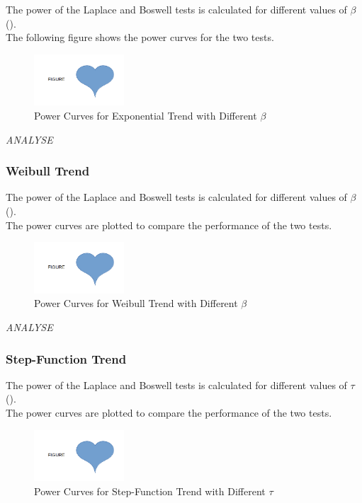 \documentclass{journalstyle}
\begin{document}
The power of the Laplace and Boswell tests is calculated for different values of $\beta$ (). \\
The following figure shows the power curves for the two tests. \\
\begin{figure}[H]
    \centering
    \includegraphics[width=0.3\textwidth]{src/power_exponential.png}
    \caption{Power Curves for Exponential Trend with Different $\beta$}
    \label{fig:power_exponential_beta}
\end{figure}

\textit{ANALYSE}


\subsubsection{Weibull Trend}

The power of the Laplace and Boswell tests is calculated for different values of $\beta$ (). \\
The power curves are plotted to compare the performance of the two tests. \\
\begin{figure}[H]
    \centering
    \includegraphics[width=0.3\textwidth]{src/power_weibull.png}
    \caption{Power Curves for Weibull Trend with Different $\beta$}
    \label{fig:power_weibull_beta}
\end{figure}

\textit{ANALYSE}


\subsubsection{Step-Function Trend}

The power of the Laplace and Boswell tests is calculated for different values of $\tau$ (). \\
The power curves are plotted to compare the performance of the two tests. \\
\begin{figure}[H]
    \centering
    \includegraphics[width=0.3\textwidth]{src/power_step_function.png}
    \caption{Power Curves for Step-Function Trend with Different $\tau$}
    \label{fig:power_step_function_tau}
\end{figure}
\end{document}

